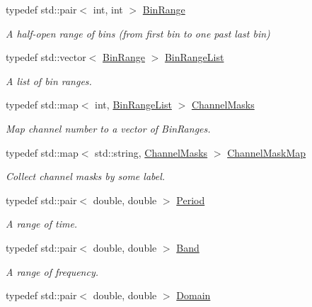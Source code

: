 \begin{DoxyCompactItemize}
typedef std\+::pair$<$ int, int $>$ \hyperlink{namespace_wire_cell_1_1_waveform_accc2021da53792e30eb4f0335b630811}{Bin\+Range}
\begin{DoxyCompactList}\small\item\em A half-\/open range of bins (from first bin to one past last bin) \end{DoxyCompactList}\item 
typedef std\+::vector$<$ \hyperlink{namespace_wire_cell_1_1_waveform_accc2021da53792e30eb4f0335b630811}{Bin\+Range} $>$ \hyperlink{namespace_wire_cell_1_1_waveform_ae9e850f13cd7f9cbcc309a5d7dd2fd37}{Bin\+Range\+List}
\begin{DoxyCompactList}\small\item\em A list of bin ranges. \end{DoxyCompactList}\item 
typedef std\+::map$<$ int, \hyperlink{namespace_wire_cell_1_1_waveform_ae9e850f13cd7f9cbcc309a5d7dd2fd37}{Bin\+Range\+List} $>$ \hyperlink{namespace_wire_cell_1_1_waveform_a3d2f1baf84b749d139533ebd4d4da3f0}{Channel\+Masks}
\begin{DoxyCompactList}\small\item\em Map channel number to a vector of Bin\+Ranges. \end{DoxyCompactList}\item 
typedef std\+::map$<$ std\+::string, \hyperlink{namespace_wire_cell_1_1_waveform_a3d2f1baf84b749d139533ebd4d4da3f0}{Channel\+Masks} $>$ \hyperlink{namespace_wire_cell_1_1_waveform_a18b9ae61c858e340252ba3ac83ac3bc0}{Channel\+Mask\+Map}
\begin{DoxyCompactList}\small\item\em Collect channel masks by some label. \end{DoxyCompactList}\item 
typedef std\+::pair$<$ double, double $>$ \hyperlink{namespace_wire_cell_1_1_waveform_a3f830cc3d44a8f05e0a3fd5f23947467}{Period}
\begin{DoxyCompactList}\small\item\em A range of time. \end{DoxyCompactList}\item 
typedef std\+::pair$<$ double, double $>$ \hyperlink{namespace_wire_cell_1_1_waveform_ab27ab5a1dc3d0ee2fb297a094e725662}{Band}
\begin{DoxyCompactList}\small\item\em A range of frequency. \end{DoxyCompactList}\item 
typedef std\+::pair$<$ double, double $>$ \hyperlink{namespace_wire_cell_1_1_waveform_aa783b1c2a84242349d5c798b7483727b}{Domain}
\end{DoxyCompactItemize}
